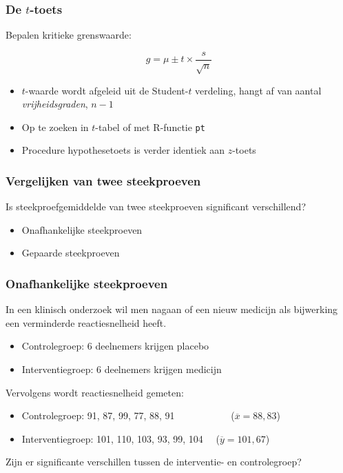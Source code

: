 \documentclass[aspectratio=169]{beamer}
\begin{document}
\begin{frame}
  \frametitle{De $t$-toets}
  
  Bepalen kritieke grenswaarde:
  
  \[ g = \mu \pm t \times \frac{s}{\sqrt{n}} \]
  
  \begin{itemize}
    \item $t$-waarde wordt afgeleid uit de Student-$t$ verdeling, hangt af van aantal \textit{vrijheidsgraden}, $n-1$
    \item Op te zoeken in $t$-tabel of met R-functie \texttt{pt}
    \item Procedure hypothesetoets is verder identiek aan $z$-toets
  \end{itemize}
  
\end{frame}

\begin{frame}
  \frametitle{Vergelijken van twee steekproeven}
  
  Is steekproefgemiddelde van twee steekproeven significant verschillend?
  
  \begin{itemize}
    \item Onafhankelijke steekproeven
    \item Gepaarde steekproeven
  \end{itemize}
\end{frame}

\begin{frame}
  \frametitle{Onafhankelijke steekproeven}
  
  In een klinisch onderzoek wil men nagaan of een nieuw medicijn als bijwerking een verminderde reactiesnelheid heeft.
  
  \begin{itemize}
    \item Controlegroep: 6 deelnemers krijgen placebo
    \item Interventiegroep: 6 deelnemers krijgen medicijn
  \end{itemize}
  
  Vervolgens wordt reactiesnelheid gemeten:
  
  \begin{itemize}
    \item Controlegroep: 91, 87, 99, 77, 88, 91 ~~~~~~~~~~~($\overline{x}=88,83$)
    \item Interventiegroep: 101, 110, 103, 93, 99, 104 ~~($\overline{y}=101,67$)
  \end{itemize}
  
  Zijn er significante verschillen tussen de interventie- en controlegroep?
\end{frame}
\end{document}
